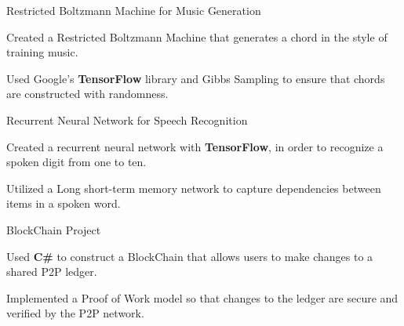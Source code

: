 \begin{cventries}
  \cventryy
    {}
    {Restricted Boltzmann Machine for Music Generation}
    {}
    {}
    {
      \begin{cvitems}
        \item {Created a Restricted Boltzmann Machine that generates a chord in the style of training music.}
        \item {Used Google's \textbf{TensorFlow} library and Gibbs Sampling to ensure that chords are constructed with randomness.}
      \end{cvitems}
    }
  \cventryy
    {}
    {Recurrent Neural Network for Speech Recognition}
    {}
    {}
    {
      \begin{cvitems}
        \item {Created a recurrent neural network with \textbf{TensorFlow}, in order to recognize a spoken digit from one to ten.}
        \item {Utilized a Long short-term memory network to capture dependencies between items in a spoken word.}
      \end{cvitems}
    }
  \cventryy
    {}
    {BlockChain Project}
    {}
    {}
    {
      \begin{cvitems}
        \item {Used \textbf{C\#} to construct a BlockChain that allows users to make changes to a shared P2P ledger.}
        \item {Implemented a Proof of Work model so that changes to the ledger are secure and verified by the P2P network.}
      \end{cvitems}
    }

\end{cventries}
